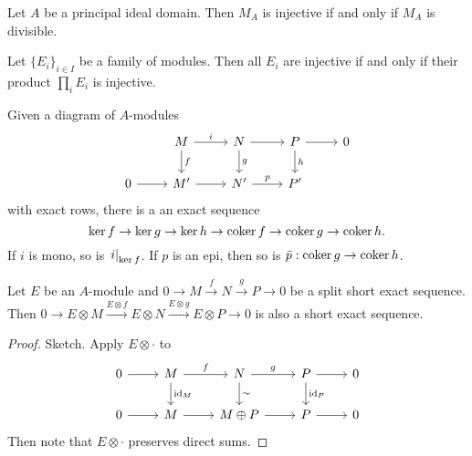 \begin{proposition}
  Let $A$ be a principal ideal domain.
  Then $M_A$ is injective if and only if $M_A$ is divisible.
\end{proposition}

\begin{corollary}
  Let $\{E_i\}_{i \in I}$ be a family of modules.
  Then all $E_i$ are injective if and only if their product $\prod_i E_i$ is
  injective.
\end{corollary}

\begin{lemma}
  Given a diagram of $A$-modules
  \[\begin{tikzcd}
	  & M & N & P & 0 \\
	  0 & {M'} & {N'} & {P'}
	  \arrow["i", from=1-2, to=1-3]
	  \arrow["f", from=1-2, to=2-2]
	  \arrow[from=1-3, to=1-4]
	  \arrow["g", from=1-3, to=2-3]
	  \arrow[from=1-4, to=1-5]
	  \arrow["h", from=1-4, to=2-4]
	  \arrow[from=2-1, to=2-2]
	  \arrow[from=2-2, to=2-3]
	  \arrow["p", from=2-3, to=2-4]
	\end{tikzcd}\]
  with exact rows, there is a an exact sequence
  \[
	\operatorname{ker} f \to \operatorname{ker} g \to \operatorname{ker} h \to \operatorname{coker} f \to \operatorname{coker} g \to
	\operatorname{coker} h.
  \]
  If $i$ is mono, so is $\left. i \right|_{\operatorname{ker} f}$.
  If $p$ is an epi, then so is $\bar{p}: \operatorname{coker} g \to \operatorname{coker} h$.
\end{lemma}

\begin{lemma}
  Let $E$ be an $A$-module and $0 \to M \xrightarrow{f} N \xrightarrow{g} P \to
  0$ be a split short exact sequence.
  Then $0 \to E \otimes M \xrightarrow{E \otimes f} E \otimes N \xrightarrow{E
	\otimes g} E \otimes P \to 0$ is also a short exact sequence.
\end{lemma}

\begin{proof}
  Sketch.
  Apply $E \otimes \cdot$ to
  \[\begin{tikzcd}
	  0 & M & N & P & 0 \\
	  0 & M & {M \oplus P} & P & 0
	  \arrow[from=1-1, to=1-2]
	  \arrow["f", from=1-2, to=1-3]
	  \arrow["{\id_M}", from=1-2, to=2-2]
	  \arrow["g", from=1-3, to=1-4]
	  \arrow["\sim", from=1-3, to=2-3]
	  \arrow[from=1-4, to=1-5]
	  \arrow["{\id_P}", from=1-4, to=2-4]
	  \arrow[from=2-1, to=2-2]
	  \arrow[from=2-2, to=2-3]
	  \arrow[from=2-3, to=2-4]
	  \arrow[from=2-4, to=2-5]
	\end{tikzcd}\]
  Then note that $E \otimes \cdot$ preserves direct sums.
\end{proof}

